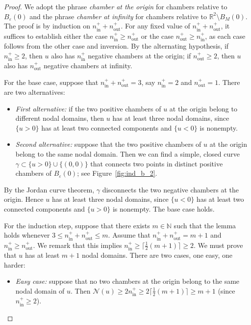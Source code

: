 \documentclass[AHL,Unicode,longabstracts,published]{cedram}
\newcommand{\N}{\mathbb{N}}
\newcommand{\R}{\mathbb{R}}
\newcommand{\nin}{n^+_{\mathrm{in}}}
\newcommand{\nout}{n^+_{\mathrm{out}}}
\newcommand{\nodal}{\mathcal{N}}
\renewcommand{\epsilon}{\varepsilon}
\newcommand{\R}{\mathbb{R}}
\begin{document}
\begin{proof}
We adopt the phrase \emph{chamber at the origin} for chambers relative to $B_\epsilon(0)$ and the phrase \emph{chamber at infinity} for chambers relative to $\R^2\setminus B_M(0)$. The proof is by induction on $\nin + \nout$. For any fixed value of $\nin+\nout$, it suffices to establish either the case $\nin\geq\nout$ or the case $\nout\geq \nin$, as each case follows from the other case and inversion. By the alternating hypothesis, if $\nin\geq 2$, then $u$ also has $\nin$ negative chambers at the origin; if $\nout\geq 2$, then $u$ also has $\nout$ negative chambers at infinity.

For the base case, suppose that $\nin+\nout=3$, say $\nin=2$ and $\nout=1$. There are two alternatives:
\begin{itemize}
\item \emph{First alternative:} if the two positive chambers of $u$ at the origin belong to different nodal domains, then $u$ has at least three nodal domains, since $\{u>0\}$ has at least two connected components and $\{u<0\}$ is nonempty.
\item \emph{Second alternative:} suppose that the two positive chambers of $u$ at the origin belong to the same nodal domain. Then we can find a simple, closed curve $\gamma \subset \{ u >0\}\cup\{(0,0)\}$ that connects two points in distinct positive chambers of $B_\epsilon(0)$; see Figure~\ref{fig:ind_b_2}.
\end{itemize}
By the Jordan curve theorem, $\gamma$ disconnects the two negative chambers at the origin. Hence $u$ has at least three nodal domains, since $\{ u < 0\}$ has at least two connected components and $\{u>0\}$ is nonempty. The base case holds.

For the induction step, suppose that there exists $m\in\N$ such that the lemma holds whenever $3 \le \nin + \nout \le m$. Assume that $\nin+\nout=m+1$ and $\nin\geq \nout$. We remark that this implies $\nin\geq \lceil \frac{1}{2}(m+1)\rceil\geq 2$. We must prove that $u$ has at least $m+1$ nodal domains. There are two cases, one easy, one harder:
\begin{itemize}
\item
\emph{Easy case:} suppose that no two chambers at the origin belong to the same nodal domain of $u$. Then $\nodal(u)\geq 2\nin\geq 2\lceil \frac{1}{2}(m+1)\rceil\geq m+1$ (since $\nin\geq 2$).


\end{itemize}
\end{proof}
\end{document}
